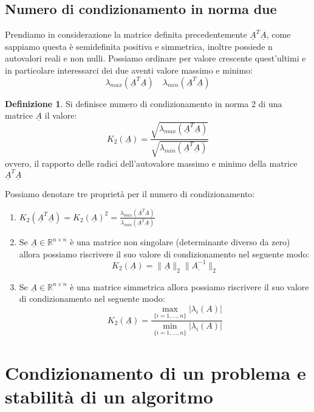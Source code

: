 \documentclass[12pt, a4paper]{book}
\theoremstyle{definition}
\newtheorem{defn}{Definizione}[section]
\newcommand{\VarMtrx}[1]{\ensuremath{\underline{#1}}}
\begin{document}
\section{Numero di condizionamento in norma due}
\begin{flushleft}


Prendiamo in considerazione la matrice definita precedentemente $\VarMtrx{A}^{T}\VarMtrx{A}$, come sappiamo questa è semidefinita positiva e simmetrica, inoltre possiede n autovalori reali e non nulli.
Possiamo ordinare per valore crescente quest'ultimi e in particolare interessarci dei due aventi valore massimo e minimo: 
\[ \lambda_{max}(\VarMtrx{A}^{T}\VarMtrx{A}) \quad \lambda_{min}(\VarMtrx{A}^{T}\VarMtrx{A}) \]

\begin{defn}
Si definisce numero di condizionamento in norma 2 di una matrice $\VarMtrx{A}$ il valore: 
\[ K_{2}(\VarMtrx{A})= \frac{\sqrt{ \lambda_{max}(\VarMtrx{A}^{T}\VarMtrx{A})}}{\sqrt{ \lambda_{min}(\VarMtrx{A}^{T}\VarMtrx{A})}}\]
ovvero, il rapporto delle radici dell'autovalore massimo e minimo della matrice  $\VarMtrx{A}^{T}\VarMtrx{A}$
\end{defn}

Possiamo denotare tre proprietà per il numero di condizionamento:

\begin{enumerate}
	\item $K_{2}(\VarMtrx{A}^{T}\VarMtrx{A}) = K_{2}(\VarMtrx{A})^{2} = \frac{\lambda_{max}(\VarMtrx{A}^{T}\VarMtrx{A})}{\lambda_{min}(\VarMtrx{A}^{T}\VarMtrx{A})}$
	\item Se $\VarMtrx{A} \in \mathbb{R}^{n \times n}$ è una matrice non singolare (determinante diverso da zero) allora possiamo riscrivere il suo valore di condizionamento nel seguente modo: 
	\[K_{2}(\VarMtrx{A}) = \lVert\VarMtrx{A}\rVert_{2}\lVert\VarMtrx{A^{-1}}\rVert_{2} \]
	\item Se $\VarMtrx{A} \in \mathbb{R}^{n \times n}$ è una matrice simmetrica allora possiamo riscrivere il suo valore di condizionamento nel seguente modo: 
	\[K_{2}(\VarMtrx{A}) = \frac{\max_{\{i=1,\dots, n\}}|\lambda_{i}(A)|}{\min_{\{i=1,\dots, n\}}|\lambda_{i}(A)|} \]
\end{enumerate}

\end{flushleft}

\chapter{Condizionamento di un problema e stabilità di un algoritmo}
\end{document}
